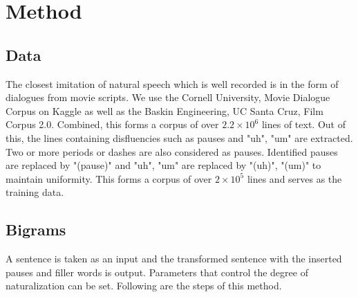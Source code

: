 \documentclass[journal]{IEEEtran}
\begin{document}
\section{Method}
\subsection{Data}
The closest imitation of natural speech which is well recorded is in the form of dialogues from movie scripts. We use the Cornell University, Movie Dialogue Corpus on Kaggle\cite{cornell} as well as the Baskin Engineering, UC Santa Cruz, Film Corpus 2.0.\cite{ucsc} Combined, this forms a corpus of over $2.2 \times 10^{6}$ lines of text. Out of this, the lines containing disfluencies such as pauses and "uh", "um" are extracted. Two or more periods or dashes are also considered as pauses. Identified pauses are replaced by "(pause)" and "uh", "um" are replaced by "(uh)", "(um)" to maintain uniformity. This forms a corpus of over $2 \times 10^{5}$ lines and serves as the training data.

\subsection{Bigrams}

A sentence is taken as an input and the transformed sentence with the inserted pauses and filler words is output. Parameters that control the degree of naturalization can be set. Following are the steps of this method.
\end{document}
